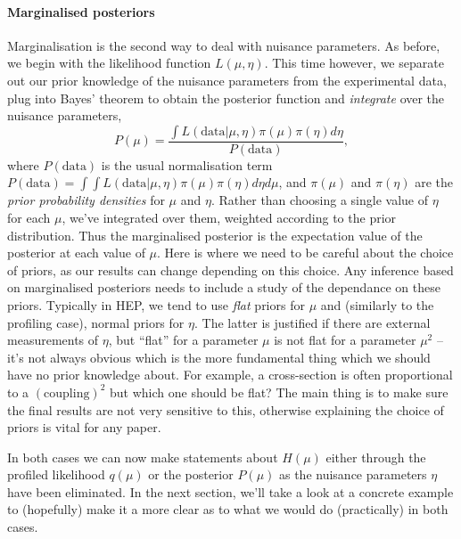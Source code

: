 \paragraph{Marginalised posteriors}\label{sec:marginalised}
Marginalisation is the second way to deal with nuisance parameters. As before, we begin with the likelihood function $L(\mu,\eta)$. This time however, we separate out our prior knowledge of the nuisance parameters from the experimental data, plug into Bayes' theorem to obtain the posterior function and \emph{integrate} over the nuisance parameters,
\begin{equation}\label{eqn:bayesmargin}
P(\mu) = \frac{\int L(\mathrm{data}|\mu,\eta)\pi(\mu)\pi(\eta) d\eta}{P(\mathrm{data})},
\end{equation}
where $P(\mathrm{data})$ is the usual normalisation term $P(\mathrm{data})=\int\int L(\mathrm{data}|\mu,\eta)\pi(\mu)\pi(\eta) d\eta d\mu  $, and $\pi(\mu)$ and $\pi(\eta)$ are the \emph{prior probability densities} for $\mu$ and $\eta$.  Rather than choosing a single value of $\eta$ for each $\mu$, we've integrated over them, weighted according to the prior distribution. Thus the marginalised posterior is the expectation value of the posterior at each value of $\mu$. Here is where we need to be careful about the choice of priors, as our results can change depending on this choice. Any inference based on marginalised posteriors needs to include a study of the dependance on these priors. Typically in HEP, we tend to use \emph{flat} priors for $\mu$ and (similarly to the profiling case), normal priors for $\eta$. The latter is justified if there are external measurements of $\eta$, but ``flat'' for a parameter $\mu$ is not flat for a parameter $\mu^{2}$ -- it's not always obvious which is the more fundamental thing which we should have no prior knowledge about. For example, a cross-section is often proportional to a $\mathrm{(coupling)}^{2}$ but which one should be flat? The main thing is to make sure the final results are not very sensitive to this, otherwise explaining the choice of priors is vital for any paper.

In both cases we can now make statements about $H(\mu)$ either through the profiled likelihood $q(\mu)$ or the posterior $P(\mu)$ as the nuisance parameters $\eta$ have been eliminated. In the next section, we'll take a look at a concrete example to (hopefully) make it a more clear as to what we would do (practically) in both cases.


